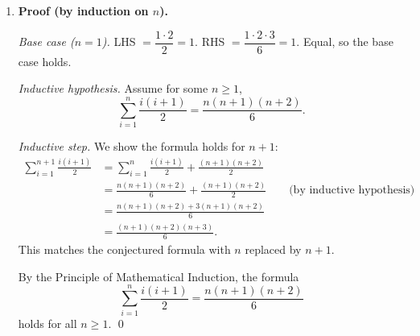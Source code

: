 \begin{solbox}[long]
\begin{solution}
\begin{enumerate}[label=(\alph*)]
    \item \textbf{Proof (by induction on $n$).}

        \emph{Base case ($n=1$).} LHS $=\dfrac{1\cdot2}{2}=1$.
        RHS $=\dfrac{1\cdot2\cdot3}{6}=1$. Equal, so the base case holds.

        \emph{Inductive hypothesis.} Assume for some $n\ge1$,
        \[
            \sum_{i=1}^{n}\frac{i(i+1)}{2} = \frac{n(n+1)(n+2)}{6}.
        \]

        \emph{Inductive step.} We show the formula holds for $n+1$:
        \begin{align*}
            \sum_{i=1}^{n+1}\frac{i(i+1)}{2}
            &= \sum_{i=1}^{n}\frac{i(i+1)}{2} + \frac{(n+1)(n+2)}{2} \\
            &= \frac{n(n+1)(n+2)}{6} + \frac{(n+1)(n+2)}{2}
                \qquad \text{(by inductive hypothesis)} \\
            &= \frac{n(n+1)(n+2) + 3(n+1)(n+2)}{6} \\
            &= \frac{(n+1)(n+2)(n+3)}{6}.
        \end{align*}
        This matches the conjectured formula with $n$ replaced by $n+1$.

        By the Principle of Mathematical Induction, the formula
        \[
            \sum_{i=1}^{n}\frac{i(i+1)}{2} = \frac{n(n+1)(n+2)}{6}
        \]
        holds for all $n\ge1$. \qed
    \end{enumerate}
\end{solution}
\end{solbox}

